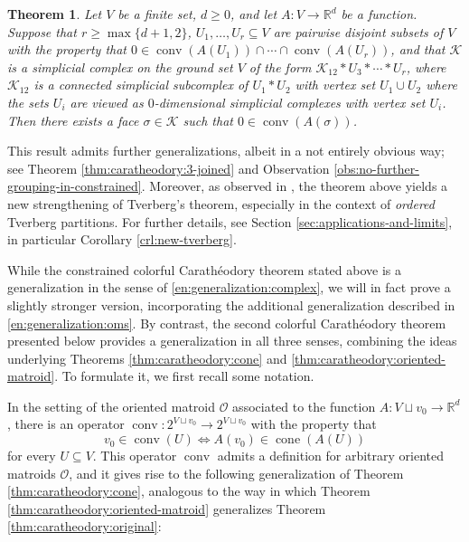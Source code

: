\documentclass[a4paper,11pt,reqno, english]{amsart}
\newtheorem{theorem}{Theorem}[section]
\theoremstyle{definition}
\theoremstyle{remark}
\newcommand\R{\mathbb R}
\DeclareMathOperator{\cone}{\mathrm{cone}}
\DeclareMathOperator{\conv}{\mathrm{conv}}
\begin{document}
\begin{theorem}\label{thm:caratheodory:constrained}
    Let $V$ be a finite set, $d\geq 0$, and let $A\colon V\to\R^d$ be a function. 
    Suppose that $r\geq\max\{d+1,2\}$, $U_1,\ldots,U_r\subseteq V$ are pairwise disjoint subsets of $V$ with the property that $0\in \conv(A(U_1))\cap\cdots\cap\conv(A(U_r))$, and  that $\mathscr{K}$ is a simplicial complex on the ground set $V$ of the form $\mathscr{K}_{12}*U_3*\cdots*U_r$, where $\mathscr{K}_{12}$ is a connected simplicial subcomplex of $U_1*U_2$ with vertex set $U_1\cup U_2$ where the sets $U_i$ are viewed as $0$-dimensional simplicial complexes with vertex set $U_i$.
    Then there exists a face $\sigma\in\mathscr{K}$ such that $0\in\conv(A(\sigma))$.
\end{theorem}


This result admits further generalizations, albeit in a not entirely obvious way; see Theorem \ref{thm:caratheodory:3-joined} and Observation \ref{obs:no-further-grouping-in-constrained}. 
Moreover, as observed in \cite[Cor.\,1.7]{Blagojevic2025}, the theorem above yields a new strengthening of Tverberg's theorem, especially in the context of \emph{ordered} Tverberg partitions. 
For further details, see Section \ref{sec:applications-and-limits}, in particular Corollary \ref{crl:new-tverberg}.
   
\medskip
While the constrained colorful Carath\'eodory theorem stated above is a generalization in the sense of \ref{en:generalization:complex}, we will in fact prove a slightly stronger version, incorporating the additional generalization described in \ref{en:generalization:oms}. 
By contrast, the second colorful Carath\'eodory theorem presented below provides a generalization in all three senses, combining the ideas underlying Theorems \ref{thm:caratheodory:cone} and \ref{thm:caratheodory:oriented-matroid}. 
To formulate it, we first recall some notation.

\medbreak
In the setting of the oriented matroid $\mathscr{O}$ associated to the function $A\colon V\sqcup{v_0}\to\R^d$, there is an operator $\conv\colon 2^{V\sqcup{v_0}}\to 2^{V\sqcup{v_0}}$ with the property that
 \[v_0\in\conv(U)\iff A(v_0)\in\cone(A(U))\] 
 for every $U\subseteq V$.
This operator $\conv$ admits a definition for arbitrary oriented matroids $\mathscr{O}$, and it gives rise to the following generalization of Theorem \ref{thm:caratheodory:cone}, analogous to the way in which Theorem \ref{thm:caratheodory:oriented-matroid} generalizes Theorem \ref{thm:caratheodory:original}:
\end{document}
